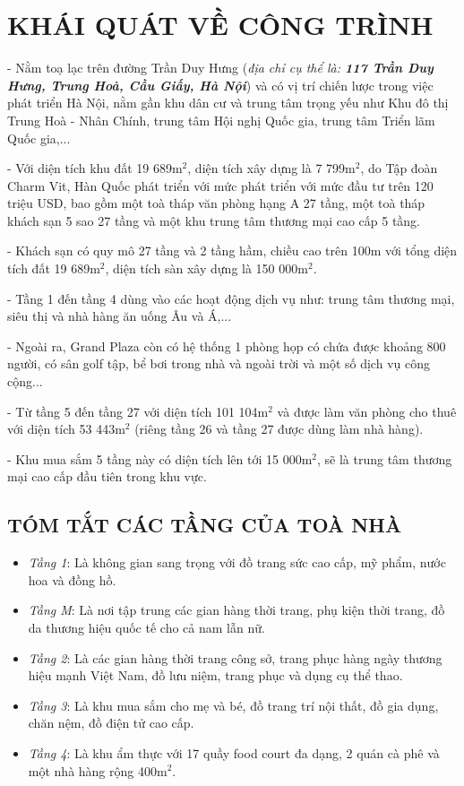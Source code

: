 
	\section{KHÁI QUÁT VỀ CÔNG TRÌNH}
	- Nằm toạ lạc trên đường Trần Duy Hưng (\emph{địa chỉ cụ thể là: \textbf{117 Trần Duy Hưng, Trung Hoà, Cầu Giấy, Hà Nội}}) và có vị trí chiến lược trong việc phát triển Hà Nội, nằm gần khu dân cư và trung tâm trọng yếu như Khu đô thị Trung Hoà - Nhân Chính, trung tâm Hội nghị Quốc gia, trung tâm Triển lãm Quốc gia,...
	
	- Với diện tích khu đất 19 689m$^{2}$, diện tích xây dựng là 7 799m$^{2}$, do Tập đoàn Charm Vit, Hàn Quốc phát triển với mức phát triển với mức đầu tư trên 120 triệu USD, bao gồm một toà tháp văn phòng hạng A 27 tầng, một toà tháp khách sạn 5 sao 27 tầng và một khu trung tâm thương mại cao cấp 5 tầng.

	- Khách sạn có quy mô 27 tầng và 2 tầng hầm, chiều cao trên 100m với tổng diện tích đất 19 689m$^{2}$, diện tích sàn xây dựng là 150 000m$^{2}$.
	
	- Tầng 1 đến tầng 4 dùng vào các hoạt động dịch vụ như: trung tâm thương mại, siêu thị và nhà hàng ăn uống Âu và Á,...
	
	- Ngoài ra, Grand Plaza còn có hệ thống 1 phòng họp có chứa được khoảng 800 người, có sân golf tập, bể bơi trong nhà và ngoài trời và một số dịch vụ công cộng...
		
	- Từ tầng 5 đến tầng 27 với diện tích 101 104m$^{2}$ và được làm văn phòng cho thuê với diện tích 53 443m$^{2}$ (riêng tầng 26 và tầng 27 được dùng làm nhà hàng).	
		
	- Khu mua sắm 5 tầng này có diện tích lên tới 15 000m$^{2}$, sẽ là trung tâm thương mại cao cấp đầu tiên trong khu vực.
	
	\subsection{TÓM TẮT CÁC TẦNG CỦA TOÀ NHÀ}
	\begin{itemize}
	\setlength\itemsep{1mm}
		\item \emph{Tầng 1}: Là không gian sang trọng với đồ trang sức cao cấp, mỹ phẩm, nước hoa và đồng hồ.
	
		\item \emph{Tầng M}: Là nơi tập trung các gian hàng thời trang, phụ kiện thời trang, đồ da thương hiệu quốc tế cho cả nam lẫn nữ.
	
		\item \emph{Tầng 2}: Là các gian hàng thời trang công sở, trang phục hàng ngày thương hiệu mạnh Việt Nam, đồ lưu niệm, trang phục và dụng cụ thể thao.
	
		\item \emph{Tầng 3}: Là khu mua sắm cho mẹ và bé, đồ trang trí nội thất, đồ gia dụng, chăn nệm, đồ điện tử cao cấp.
	
		\item \emph{Tầng 4}: Là khu ẩm thực với 17 quầy food court đa dạng, 2 quán cà phê và một nhà hàng rộng 400m$^{2}$.
	\end{itemize}
	
